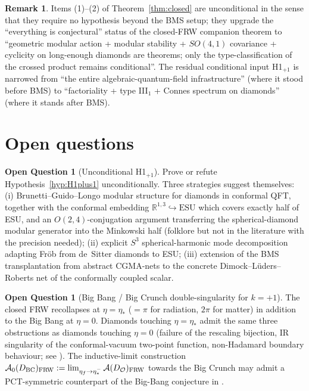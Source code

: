 \documentclass[11pt]{article}
\theoremstyle{definition}
\newtheorem{remark}[theorem]{Remark}
\newtheorem{question}[theorem]{Open Question}
\newcommand{\R}{\mathbb{R}}
\renewcommand{\AA}{\mathcal{A}}
\newcommand{\OO}{\mathcal{O}}
\newcommand{\FRW}{\mathrm{FRW}}
\newcommand{\ESU}{\mathrm{ESU}}
\begin{document}
\begin{remark}\label{rem:closed-status}
Items (1)--(2) of Theorem~\ref{thm:closed} are unconditional in the sense
that they require no hypothesis beyond the BMS setup; they upgrade the
``everything is conjectural'' status of the closed-FRW companion theorem
to ``geometric modular action + modular stability + $SO(4,1)$ covariance +
cyclicity on long-enough diamonds are theorems; only the type-classification
of the crossed product remains conditional''. The residual conditional
input H1$_{+1}$ is narrowed from ``the entire algebraic-quantum-field
infrastructure'' (where it stood before BMS) to ``factoriality + type
III$_1$ + Connes spectrum on diamonds'' (where it stands after BMS).
\end{remark}

\section{Open questions}\label{sec:openq}

\begin{question}[Unconditional H1$_{+1}$]\label{q:H1}
Prove or refute Hypothesis~\ref{hyp:H1plus1} unconditionally. Three
strategies suggest themselves: (i) Brunetti--Guido--Longo \cite{BGL1993}
modular structure for diamonds in conformal QFT, together with the conformal
embedding $\R^{1,3}\hookrightarrow\ESU$ which covers exactly half of ESU,
and an $O(2,4)$-conjugation argument transferring the spherical-diamond
modular generator into the Minkowski half (folklore but not in the
literature with the precision needed); (ii) explicit $S^3$
spherical-harmonic mode decomposition adapting Fr\"ob \cite{Frob2023}
from de~Sitter diamonds to ESU; (iii) extension of the BMS transplantation
\cite{BMS2000} from abstract CGMA-nets to the concrete
Dimock--L\"uders--Roberts net \cite{Dimock1980, LudersRoberts1990} of the
conformally coupled scalar.
\end{question}

\begin{question}[Big Bang / Big Crunch double-singularity for $k=+1$]\label{q:bbc}
The closed FRW recollapses at $\eta=\eta_*$ ($=\pi$ for radiation,
$2\pi$ for matter) in addition to the Big Bang at $\eta=0$. Diamonds
touching $\eta=\eta_*$ admit the same three obstructions as diamonds
touching $\eta=0$ (failure of the rescaling bijection, IR singularity of
the conformal-vacuum two-point function, non-Hadamard boundary behaviour;
see \cite[Question~6.4]{Remondiere2026}). The inductive-limit construction
$\AA_0(D_{\rm BC})_\FRW:=\lim_{\eta_f\to\eta_*^-}\AA(D_\OO)_\FRW$ towards
the Big Crunch may admit a PCT-symmetric counterpart of the Big-Bang
conjecture in \cite[Question~6.4]{Remondiere2026}.
\end{question}
\end{document}
